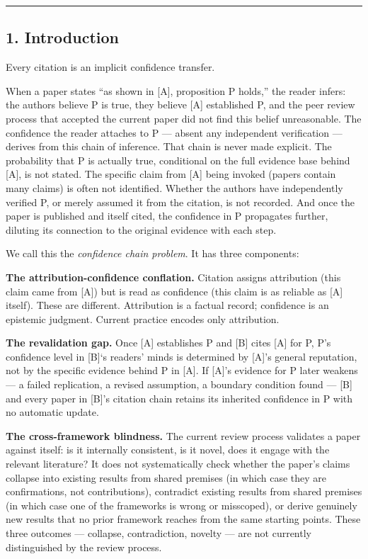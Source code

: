 \documentclass[
]{article}
\begin{document}
\begin{center}\rule{0.5\linewidth}{0.5pt}\end{center}

\subsection{1. Introduction}\label{introduction}

Every citation is an implicit confidence transfer.

When a paper states ``as shown in {[}A{]}, proposition P holds,'' the
reader infers: the authors believe P is true, they believe {[}A{]}
established P, and the peer review process that accepted the current
paper did not find this belief unreasonable. The confidence the reader
attaches to P --- absent any independent verification --- derives from
this chain of inference. That chain is never made explicit. The
probability that P is actually true, conditional on the full evidence
base behind {[}A{]}, is not stated. The specific claim from {[}A{]}
being invoked (papers contain many claims) is often not identified.
Whether the authors have independently verified P, or merely assumed it
from the citation, is not recorded. And once the paper is published and
itself cited, the confidence in P propagates further, diluting its
connection to the original evidence with each step.

We call this the \emph{confidence chain problem}. It has three
components:

\textbf{The attribution-confidence conflation.} Citation assigns
attribution (this claim came from {[}A{]}) but is read as confidence
(this claim is as reliable as {[}A{]} itself). These are different.
Attribution is a factual record; confidence is an epistemic judgment.
Current practice encodes only attribution.

\textbf{The revalidation gap.} Once {[}A{]} establishes P and {[}B{]}
cites {[}A{]} for P, P's confidence level in {[}B{]}`s readers' minds is
determined by {[}A{]}'s general reputation, not by the specific evidence
behind P in {[}A{]}. If {[}A{]}'s evidence for P later weakens --- a
failed replication, a revised assumption, a boundary condition found ---
{[}B{]} and every paper in {[}B{]}'s citation chain retains its
inherited confidence in P with no automatic update.

\textbf{The cross-framework blindness.} The current review process
validates a paper against itself: is it internally consistent, is it
novel, does it engage with the relevant literature? It does not
systematically check whether the paper's claims collapse into existing
results from shared premises (in which case they are confirmations, not
contributions), contradict existing results from shared premises (in
which case one of the frameworks is wrong or misscoped), or derive
genuinely new results that no prior framework reaches from the same
starting points. These three outcomes --- collapse, contradiction,
novelty --- are not currently distinguished by the review process.
\end{document}
